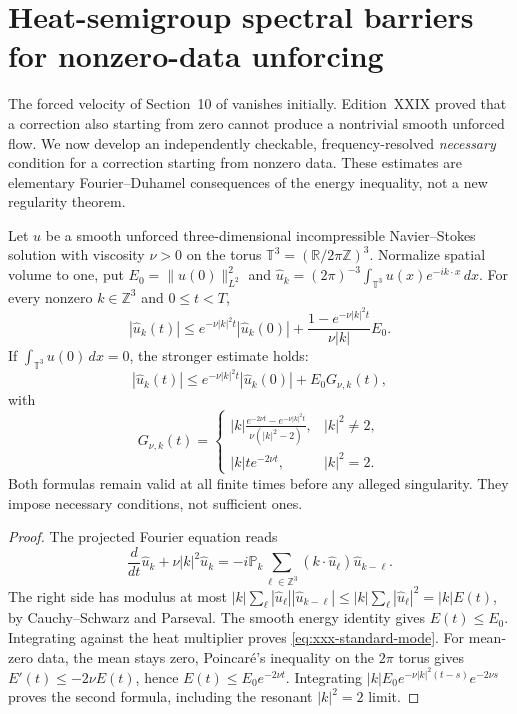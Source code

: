 \section{Heat-semigroup spectral barriers for nonzero-data unforcing}
\label{sec:xxx-spectral-barrier}

The forced velocity of Section~10 of \cite{openai2026} vanishes
initially. Edition~XXIX proved that a correction also starting from
zero cannot produce a nontrivial smooth unforced flow. We now develop
an independently checkable, frequency-resolved \emph{necessary}
condition for a correction starting from nonzero data. These estimates
are elementary Fourier--Duhamel consequences of the energy inequality,
not a new regularity theorem.

\begin{theorem}
\label{thm:xxx-periodic}
Let $u$ be a smooth unforced three-dimensional incompressible
Navier--Stokes solution with viscosity $\nu>0$ on the torus
$\mathbb T^3=(\mathbb R/2\pi\mathbb Z)^3$. Normalize spatial volume
to one, put $E_0=\|u(0)\|_{L^2}^2$ and
$\widehat u_k=(2\pi)^{-3}\int_{\mathbb T^3}u(x)e^{-ik\cdot x}\,dx$.
For every nonzero $k\in\mathbb Z^3$ and $0\le t<T$,
\begin{equation}\label{eq:xxx-standard-mode}
\boxed{
|\widehat u_k(t)|\le e^{-\nu|k|^2t}|\widehat u_k(0)|+
\frac{1-e^{-\nu|k|^2t}}{\nu|k|}E_0.}
\end{equation}
If $\int_{\mathbb T^3}u(0)\,dx=0$, the stronger estimate holds:
\begin{equation}\label{eq:xxx-mean-zero-mode}
\boxed{|\widehat u_k(t)|\le
 e^{-\nu|k|^2t}|\widehat u_k(0)|+E_0G_{\nu,k}(t),}
\end{equation}
with
\[
G_{\nu,k}(t)=\begin{cases}
\displaystyle |k|\frac{e^{-2\nu t}-e^{-\nu|k|^2t}}
{\nu(|k|^2-2)},&|k|^2\ne2,\\[5pt]
\displaystyle |k|t e^{-2\nu t},&|k|^2=2.
\end{cases}
\]
Both formulas remain valid at all finite times before any alleged
singularity. They impose necessary conditions, not sufficient ones.
\end{theorem}
\begin{proof}
The projected Fourier equation reads
\[
\frac{d}{dt}\widehat u_k+\nu|k|^2\widehat u_k
=-i\mathbb P_k\sum_{\ell\in\mathbb Z^3}
 (k\cdot\widehat u_\ell)\widehat u_{k-\ell}.
\]
The right side has modulus at most
$|k|\sum_\ell|\widehat u_\ell||\widehat u_{k-\ell}|
\le |k|\sum_\ell|\widehat u_\ell|^2=|k|E(t)$,
by Cauchy--Schwarz and Parseval. The smooth energy identity gives
$E(t)\le E_0$. Integrating against the heat multiplier proves
\eqref{eq:xxx-standard-mode}. For mean-zero data, the mean stays
zero, Poincar\'e's inequality on the $2\pi$ torus gives
$E'(t)\le-2\nu E(t)$, hence $E(t)\le E_0e^{-2\nu t}$.
Integrating $|k|E_0e^{-\nu|k|^2(t-s)}e^{-2\nu s}$
proves the second formula, including the resonant
$|k|^2=2$ limit.
\end{proof}

